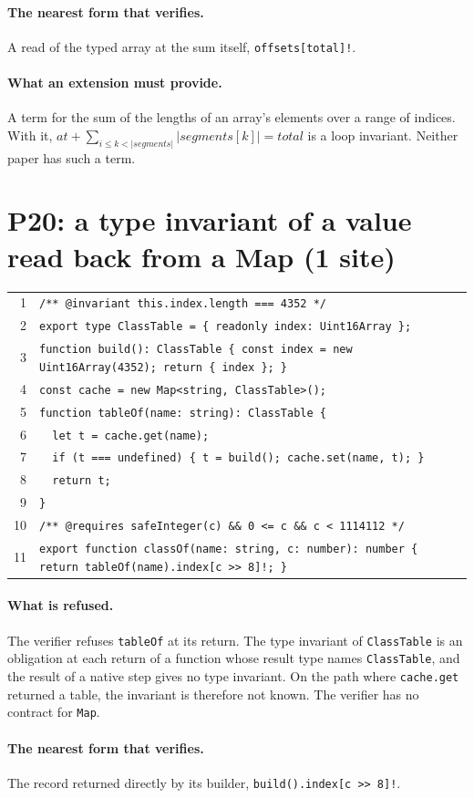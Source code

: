 \documentclass[10pt,a4paper]{article}
\theoremstyle{definition}
\theoremstyle{remark}
\newcommand{\len}[1]{|#1|}
\newcommand{\code}[1]{\texttt{#1}}
\newcommand{\entry}[1]{\paragraph{#1.}}
\begin{document}
\entry{The nearest form that verifies} A read of the typed array at the sum itself,
\code{offsets[total]!}.

\entry{What an extension must provide} A term for the sum of the lengths of an array's elements
over a range of indices. With it,
$\mathit{at}+\sum_{i\le k<\len{\mathit{segments}}}\len{\mathit{segments}[k]}=\mathit{total}$
is a loop invariant. Neither paper has such a term.

\section{P20: a type invariant of a value read back from a Map (1 site)}

{\footnotesize
\begin{tabular}{@{}r@{\hspace{1em}}l@{}}
1 & \code{/** @invariant this.index.length === 4352 */} \\
2 & \code{export type ClassTable = \{ readonly index: Uint16Array \};} \\
3 & \code{function build(): ClassTable \{ const index = new Uint16Array(4352); return \{ index \}; \}} \\
4 & \code{const cache = new Map<string, ClassTable>();} \\
5 & \code{function tableOf(name: string): ClassTable \{} \\
6 & \code{~~let t = cache.get(name);} \\
7 & \code{~~if (t === undefined) \{ t = build(); cache.set(name, t); \}} \\
8 & \code{~~return t;} \\
9 & \code{\}} \\
10 & \code{/** @requires safeInteger(c) \&\& 0 <= c \&\& c < 1114112 */} \\
11 & \code{export function classOf(name: string, c: number): number \{ return tableOf(name).index[c >{}> 8]!; \}} \\
\end{tabular}}

\entry{What is refused} The verifier refuses \code{tableOf} at its return.
The type invariant of \code{ClassTable} is an obligation at each
return of a function whose result type names \code{ClassTable}, and
the result of a native step gives no type invariant. On the path where
\code{cache.get} returned a table, the invariant is therefore not
known. The verifier has no contract for \code{Map}.

\entry{The nearest form that verifies} The record returned directly by its builder,
\code{build().index[c >{}> 8]!}.
\end{document}
